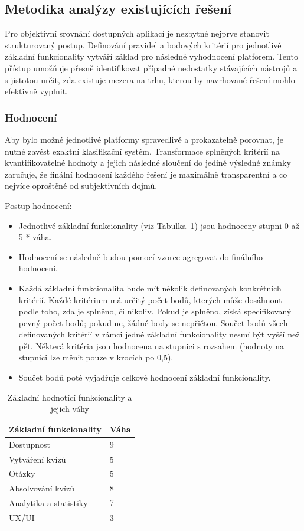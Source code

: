 \documentclass{vskpou} %
\begin{document}
\subsection{Metodika analýzy existujících řešení}

Pro objektivní srovnání dostupných aplikací je nezbytné nejprve stanovit strukturovaný postup. Definování pravidel a bodových kritérií pro jednotlivé základní funkcionality vytváří základ pro následné vyhodnocení platforem. Tento přístup umožňuje přesně identifikovat případné nedostatky stávajících nástrojů a s jistotou určit, zda existuje mezera na trhu, kterou by navrhované řešení mohlo efektivně vyplnit.

\subsubsection{Hodnocení}

Aby bylo možné jednotlivé platformy spravedlivě a prokazatelně porovnat, je nutné zavést exaktní klasifikační systém. Transformace splněných kritérií na kvantifikovatelné hodnoty a jejich následné sloučení do jediné výsledné známky zaručuje, že finální hodnocení každého řešení je maximálně transparentní a co nejvíce oproštěné od subjektivních dojmů.

Postup hodnocení:

\begin{itemize}
    \item Jednotlivé základní funkcionality (viz Tabulka~\ref{tab:funkcionality}) jsou hodnoceny stupni 0 až 5 * váha.
    \item Hodnocení se následně budou pomocí vzorce agregovat do finálního hodnocení.
    \item Každá základní funkcionalita bude mít několik definovaných konkrétních kritérií. Každé kritérium má určitý počet bodů, kterých může dosáhnout podle toho, zda je splněno, či nikoliv. Pokud je splněno, získá specifikovaný pevný počet bodů; pokud ne, žádné body se nepřičtou. Součet bodů všech definovaných kritérií v rámci jedné základní funkcionality nesmí být vyšší než pět. Některá kritéria jsou hodnocena na stupnici s rozsahem (hodnoty na stupnici lze měnit pouze v krocích po 0,5).
    \item Součet bodů poté vyjadřuje celkové hodnocení základní funkcionality.
\end{itemize}

\begin{table}[H]
\caption{Základní hodnotící funkcionality a jejich váhy}
\label{tab:funkcionality}
\centering
\begin{tabular}{|l|l|}
\hline
\textbf{Základní funkcionality} & \textbf{Váha} \\ \hline
Dostupnost & 9 \\ \hline
Vytváření kvízů & 5 \\ \hline
Otázky & 5 \\ \hline
Absolvování kvízů & 8 \\ \hline
Analytika a statistiky & 7 \\ \hline
UX/UI & 3 \\ \hline
\end{tabular}
\end{table}
\end{document}
